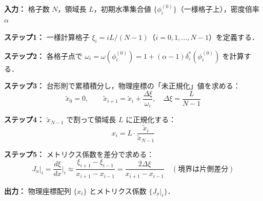 \begin{tcolorbox}[algbox, title={1次元格子点生成アルゴリズム（台形則積分）}]
\textbf{入力：} 格子数 $N$，領域長 $L$，初期水準集合値 $\{\phi^{(0)}_i\}$（一様格子上），密度倍率 $\alpha$

\textbf{ステップ1：} 一様計算格子 $\xi_i = iL/(N-1)$（$i=0,1,\ldots,N-1$）を定義する．

\textbf{ステップ2：} 各格子点で $\omega_i = \omega(\phi^{(0)}_i) = 1 + (\alpha-1)\delta_\varepsilon^*(\phi^{(0)}_i)$ を計算する．

\textbf{ステップ3：} 台形則で累積積分し，物理座標の「未正規化」値を求める：
\[
  \tilde{x}_0 = 0, \qquad
  \tilde{x}_{i+1} = \tilde{x}_i + \frac{\Delta\xi}{\omega_i},
  \quad \Delta\xi = \frac{L}{N-1}
\]

\textbf{ステップ4：} $\tilde{x}_{N-1}$ で割って領域長 $L$ に正規化する：
\[
  x_i = L \cdot \frac{\tilde{x}_i}{\tilde{x}_{N-1}}
\]

\textbf{ステップ5：} メトリクス係数を差分で求める：
\[
  J_x\big|_i = \frac{d\xi}{dx}\bigg|_i \approx \frac{\xi_{i+1}-\xi_{i-1}}{x_{i+1}-x_{i-1}}
  = \frac{2\Delta\xi}{x_{i+1}-x_{i-1}}
  \quad (\text{境界は片側差分})
\]

\textbf{出力：} 物理座標配列 $\{x_i\}$ とメトリクス係数 $\{J_x|_i\}$．
\end{tcolorbox}

